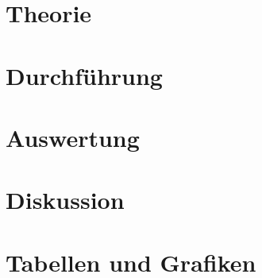 \documentclass[a4paper,twoside]{article}
\begin{document}
\section{Theorie}

\section{Durchführung}

\section{Auswertung}
 
\section{Diskussion}
 
\appendix
\newpage
\section{Tabellen und Grafiken}
 

\newpage

\end{document}
